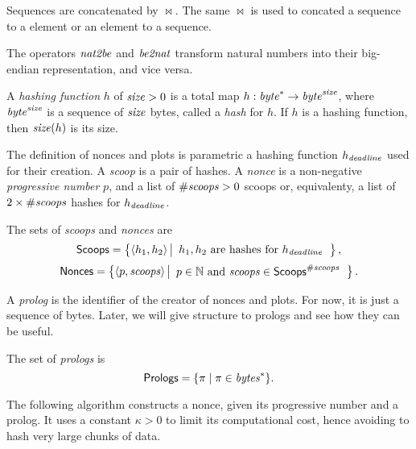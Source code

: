 %
\begin{definition}
  Sequences are concatenated by $\bowtie$. The same $\bowtie$
  is used to concated a sequence to a element or an element to a sequence.
\end{definition}
%
\begin{definition}
  The operators ${\mathit{nat2be}}$ and ${\mathit{be2nat}}$ transform natural numbers
  into their big-endian representation, and vice versa.
\end{definition}
%
\begin{definition}
  A \emph{hashing function} $h$ of ${\mathit{size}}>0$
  is a total map $h:\mathit{byte}^*\to\mathit{byte}^{\mathit{size}}$, where
  $\mathit{byte}^{\mathit{size}}$ is a sequence of ${\mathit{size}}$ bytes, called a \emph{hash} for $h$.
  If $h$ is a hashing function, then ${\mathit{size}}(h)$ is its size.
\end{definition}
%
The definition of nonces and plots is parametric \wrt a hashing
function $h_{\mathit{deadline}}$ used for their creation.
A \emph{scoop} is a pair of hashes.
A \emph{nonce} is a non-negative \emph{progressive number} $p$, and
a list of ${\#\mathit{scoops}}>0$ scoops or, equivalenty,
a list of $2\times{\#\mathit{scoops}}$ hashes for $h_{\mathit{deadline}}$.
%
\begin{definition}
  The sets of \emph{scoops} and \emph{nonces} are
  \[
  {\mathsf{Scoops}}=\left\{\langle h_1,h_2\rangle\left|\begin{array}{l}
  h_1,h_2\text{ are hashes for }h_{\mathit{deadline}}
  \end{array}\right.\right\},
  \]
  \[
  {\mathsf{Nonces}}=\left\{\langle p,{\mathit{scoops}}\rangle\left|\begin{array}{l}
  p\in\mathbb{N}\text{ and }{\mathit{scoops}}\in{\mathsf{Scoops}}^{\#\mathit{scoops}}
  \end{array}\right.\right\}.
  \]
\end{definition}
%
A \emph{prolog} is the identifier of the creator of nonces and plots.
For now, it is just a sequence of bytes. Later, we will give structure to prologs
and see how they can be useful.
%
\begin{definition}[Prolog]\label{def:prolog}
  The set of \emph{prologs} is
  \[
  {\mathsf{Prologs}}=\{\pi\mid\pi\in\mathit{bytes}^*\}.
  \]
\end{definition}
%
The following algorithm constructs a nonce, given its progressive number and a prolog.
It uses a constant $\kappa>0$ to limit its computational cost, hence avoiding to hash
very large chunks of data.
%
